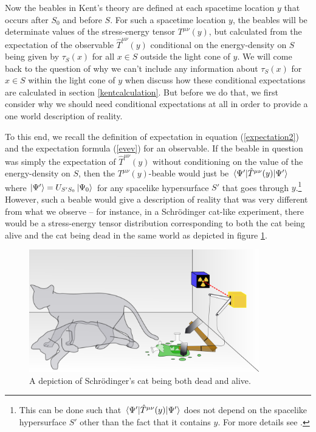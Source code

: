 Now the  beables in Kent's theory are defined at each spacetime location $y$ that occurs after $S_0$ and before $S$. For such a spacetime location $y$, the beables will be determinate values of the stress-energy tensor $T^{\mu\nu}(y)$, but calculated from the expectation of the observable $\hat{T}^{\mu\nu}(y)$ conditional on the energy-density on $S$ being given by $\tau_S(x)$ for all $x\in S$ outside the light cone of $y$. We will come back to the question of why we can't include any information about $\tau_S(x)$ for $x\in S$ within the light cone of $y$ when discuss how these conditional expectations are calculated in section \ref{kentcalculation}. But before we do that, we first consider why we should need conditional expectations at all in order to provide a one world description of reality.


To this end, we recall the definition of expectation in equation (\ref{expectation2}) and the expectation formula (\ref{evev}) for an observable. If the beable in question was simply the expectation of $\hat{T}^{\mu\nu}(y)$ without conditioning on the value of the energy-density on $S$, then the $T^{\mu\nu}(y)$-beable would just be $\ev*{\hat{T}^{\mu\nu}(y)}{\Psi'}$ where $\ket{\Psi'}=U_{S'S_0}\ket{\Psi_0}$ for any spacelike hypersurface $S'$ that goes through $y$.\footnote{This can be done such that $\ev*{\hat{T}^{\mu\nu}(y)}{\Psi'}$ does not depend on the spacelike hypersurface $S'$ other than the fact that it contains $y$. For more details see \cite{SchwingerJulianI}.} However, such a beable would give a description of reality that was very different from what we observe -- for instance, in a Schr\"{o}dinger cat-like experiment, there would be a stress-energy tensor distribution corresponding to both the cat being alive and the cat being dead in the same world as depicted in figure \ref{deadlivecat}.
\begin{figure}[ht!]
  \captionsetup{justification=justified}
  \centering
  \includegraphics[width=100mm]{Chapter03/Schrodingers_cat.png}
  \caption[Caption for LOF]{A depiction of Schr\"{o}dinger's cat being both dead and alive.\protect\footnotemark}
  \label{deadlivecat}
  \end{figure}
